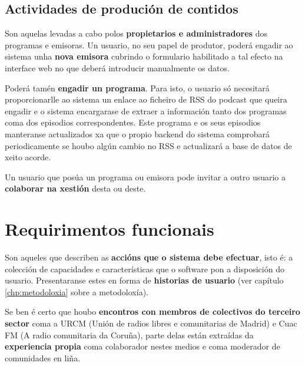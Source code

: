 \subsection{Actividades de produción de contidos}

Son aquelas levadas a cabo polos \textbf{propietarios e administradores} dos programas e emisoras. Un usuario, no seu papel de produtor, poderá engadir ao sistema unha \textbf{nova emisora} cubrindo o formulario habilitado a tal efecto na interface web no que deberá introducir manualmente os datos.

Poderá tamén \textbf{engadir un programa}. Para isto, o usuario só necesitará proporcionarlle ao sistema un enlace ao ficheiro de RSS do podcast que queira engadir e o sistema encargarase de extraer a información tanto dos programas coma dos episodios correspondentes. Este programa e os seus episodios manteranse actualizados xa que o propio backend do sistema comprobará periodicamente se houbo algún cambio no RSS e actualizará a base de datos de xeito acorde.  

Un usuario que posúa un programa ou emisora pode invitar a outro usuario a \textbf{colaborar na xestión} desta ou deste.


\section{Requirimentos funcionais}

Son aqueles que describen as \textbf{accións que o sistema debe efectuar}, isto é: a colección de capacidades e características que o software pon a disposición do usuario. Presentaranse estes en forma de \textbf{historias de usuario} (ver capítulo \ref{chp:metodoloxia} sobre a metodoloxía). 

Se ben é certo que houbo \textbf{encontros con membros de colectivos do terceiro sector} coma a URCM (Unión de radios libres e comunitarias de Madrid) e Cuac FM (A radio comunitaria da Coruña), parte delas están extraídas da \textbf{experiencia propia} coma colaborador nestes medios e coma moderador de comunidades en liña.


